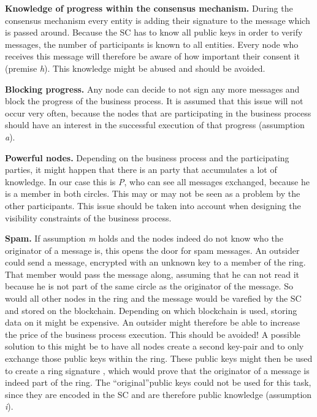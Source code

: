 \documentclass[runningheads]{llncs}
\newcommand{\ber}[1]{\textit{#1}}
\renewcommand{\bigbreak}{}
\newcommand{\quotel}{``}
\newcommand{\quoter}{''}
\begin{document}
\bigbreak
\textbf{Knowledge of progress within the consensus mechanism.} During the consensus mechanism every entity is adding their signature to the message which is passed around. Because the SC has to know all public keys in order to verify messages, the number of participants is known to all entities. Every node who receives this message will therefore be aware of how important their consent it (premise \ber{h}). This knowledge might be abused and should be avoided.


\bigbreak
\textbf{Blocking progress.} Any node can decide to not sign any more messages and block the progress of the business process. It is assumed that this issue will not occur very often, because the nodes that are participating in the business process should have an interest in the successful execution of that progress (assumption \ber{a}).


\bigbreak
\textbf{Powerful nodes.} Depending on the business process and the participating parties, it might happen that there is an party that accumulates a lot of knowledge. In our case this is \ber{P}, who can see all messages exchanged, because he is a member in both circles. This may or may not be seen as a problem by the other participants. This issue should be taken into account when designing the visibility constraints of the business process. 


\bigbreak
\textbf{Spam.} If assumption \ber{m} holds and the nodes indeed do not know who the originator of a message is, this opens the door for spam messages. An outsider could send a message, encrypted with an unknown key to a member of the ring. That member would pass the message along, assuming that he can not read it because he is not part of the same circle as the originator of the message. So would all other nodes in the ring and the message would be varefied by the SC and stored on the blockchain. Depending on which blockchain is used, storing data on it might be expensive. An outsider might therefore be able to increase the price of the business process execution. This should be avoided! A possible solution to this might be to have all nodes create a second key-pair and to only exchange those public keys within the ring. These public keys might then be used to create a ring signature \cite{rivest2001leak}, which would prove that the originator of a message is indeed part of the ring. The \quotel original\quoter  public keys could not be used for this task, since they are encoded in the SC and are therefore public knowledge (assumption \ber{i}). 
\end{document}
